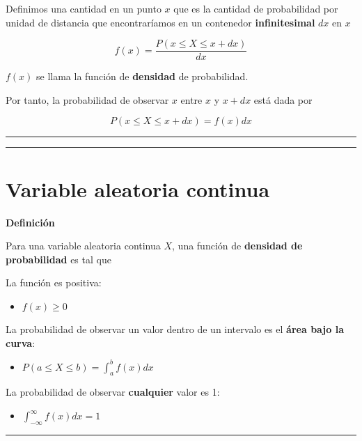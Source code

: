 \documentclass[
]{book}
\providecommand{\tightlist}{%
  \setlength{\itemsep}{0pt}\setlength{\parskip}{0pt}}
\begin{document}
Definimos una cantidad en un punto \(x\) que es la cantidad de probabilidad por unidad de distancia que encontraríamos en un contenedor \textbf{infinitesimal} \(dx\) en \(x\)

\[f(x)= \frac{P(x\leq X \leq x+dx)}{dx}\]

\(f(x)\) se llama la función de \textbf{densidad} de probabilidad.

Por tanto, la probabilidad de observar \(x\) entre \(x\) y \(x+dx\)
está dada por

\[P(x\leq X \leq x+dx)= f(x) dx\]

\begin{center}\rule{0.5\linewidth}{0.5pt}\end{center}

\begin{center}\rule{0.5\linewidth}{0.5pt}\end{center}

\hypertarget{variable-aleatoria-continua-3}{%
\section{Variable aleatoria continua}\label{variable-aleatoria-continua-3}}

\textbf{Definición}

Para una variable aleatoria continua \(X\), una función de \textbf{densidad de probabilidad} es tal que

La función es positiva:

\begin{itemize}
\tightlist
\item
  \(f(x) \geq 0\)
\end{itemize}

La probabilidad de observar un valor dentro de un intervalo es el \textbf{área bajo la curva}:

\begin{itemize}
\tightlist
\item
  \(P(a\leq X \leq b)=\int_{a}^{b} f(x) dx\)
\end{itemize}

La probabilidad de observar \textbf{cualquier} valor es 1:

\begin{itemize}
\tightlist
\item
  \(\int_{-\infty}^{\infty} f(x) dx = 1\)
\end{itemize}

\begin{center}\rule{0.5\linewidth}{0.5pt}\end{center}
\end{document}

